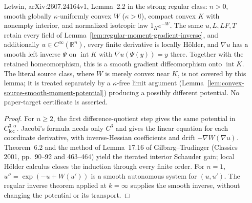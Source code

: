 \begin{lemma}
  \label{lem:regular-moment-smooth}
  \leanok
  Letwin, arXiv:2607.24164v1, Lemma~2.2 in the strong regular class: $n>0$, smooth globally
  $\kappa$-uniformly convex $W$ ($\kappa>0$), compact convex $K$ with nonempty interior, and
  normalized isotropic law $1_K e^{-W}$. The same $u,L,LF,T$ retain every field of
  Lemma~\ref{lem:regular-moment-gradient-inverse}, and additionally $u\in C^\infty(\mathbb R^n)$,
  every finite derivative is locally H\"older, and $\nabla u$ has a smooth left inverse $\Psi$ on
  $\operatorname{int}K$ with $\nabla u(\Psi(y))=y$ there. Together with the retained homeomorphism,
  this is a smooth gradient diffeomorphism onto $\operatorname{int}K$.
  The literal source class, where $W$ is merely convex near $\overline K$, is not covered by this
  lemma; it is treated separately by a $\kappa$-free limit argument (Lemma~\ref{lem:convex-source-smooth-moment-potential}) producing a possibly different
  potential. No paper-target certificate is asserted.
\end{lemma}
\begin{proof}
  \leanok
  For $n\ge2$, the first difference-quotient step gives the same potential in
  $C^{3,\alpha}_{\mathrm{loc}}$. Jacobi's formula needs only $C^3$ and gives the linear equation
  for each coordinate derivative, with inverse-Hessian coefficients and drift
  $-\nabla W(\nabla u)$. Theorem~6.2 and the method of Lemma~17.16 of Gilbarg--Trudinger
  (Classics 2001, pp.~90--92 and 463--464) yield the iterated interior Schauder gain;
  local H\"older calculus closes the induction through every finite order.
  For $n=1$, $u''=\exp(-u+W(u'))$ is a smooth autonomous system for $(u,u')$.
  The regular inverse theorem applied at $k=\infty$ supplies the smooth inverse, without
  changing the potential or its transport.
\end{proof}


